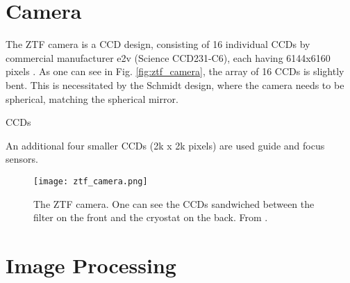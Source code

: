 \section{Camera}
The ZTF camera is a CCD design, consisting of 16 individual CCDs by commercial manufacturer e2v (Science CCD231-C6), each having 6144x6160 pixels  . As one can see in Fig. \ref{fig:ztf_camera}, the array of 16 CCDs is slightly bent. This is necessitated by the Schmidt design, 
where the camera needs to be spherical, matching the spherical mirror.

CCDs

An additional four smaller CCDs (2k x 2k pixels) are used guide and focus sensors.

\begin{figure}[]
    \texttt{[image: ztf\_camera.png]}
    \caption[The ZTF Camera]{The ZTF camera. One can see the CCDs sandwiched between the filter on the front and the cryostat on the back. From \cite{Bellm2018}.}
\end{figure}

\section{Image Processing}
